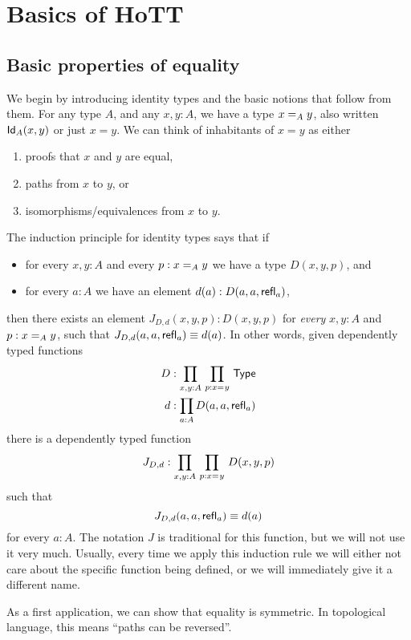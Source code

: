 \chapter{Basics of HoTT}
\label{cha:basics}

\section{Basic properties of equality}
\label{sec:equality}


We begin by introducing identity types and the basic notions that follow from them.
For any type $A$, and any $x,y:A$, we have a type $\id[A]{x}{y}$, also written $\idtype[A]{x}{y}$ or just $x=y$.
We can think of inhabitants of $x=y$ as either
\begin{enumerate}
\item proofs that $x$ and $y$ are equal,
\item paths from $x$ to $y$, or
\item isomorphisms/equivalences from $x$ to $y$.
\end{enumerate}
The induction principle for identity types says that if
\begin{itemize}
\item for every $x,y:A$ and every $p:\id[A]xy$ we have a type $D(x,y,p)$, and
\item for every $a:A$ we have an element $d(a):D(a,a,\refl a)$, 
\end{itemize}
then there exists an element $J_{D,d}(x,y,p):D(x,y,p)$ for \emph{every} $x,y:A$ and $p:\id[A]xy$, such that $J_{D,d}(a,a,\refl a) \jdeq d(a)$.
In other words, given dependently typed functions
\begin{align*}
D & :\prod_{x,y:A}\, \prod_{p:\id{x}{y}} \,\type\\
d & :\prod_{a:A} D(a,a,\refl{a})
\end{align*}
there is a dependently typed function
\[J_{D,d}:\prod_{x,y:A} \,\prod_{p:\id{x}{y}} \,D(x,y,p)\]
such that 
\begin{equation}\label{eq:Jconv}
J_{D,d}(a,a,\refl{a})\jdeq d(a)
\end{equation}
for every $a:A$.
The notation $J$ is traditional for this function, but we will not use it very much.
Usually, every time we apply this induction rule we will either not care about the specific function being defined, or we will immediately give it a different name.

As a first application, we can show that equality is symmetric.
In topological language, this means ``paths can be reversed''.


